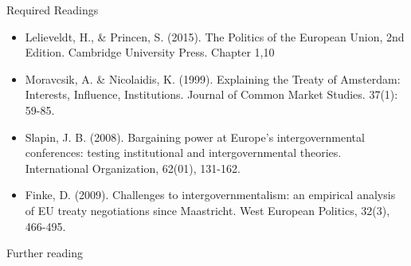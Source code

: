 \noindent Required Readings

\begin{itemize}
	\item Lelieveldt, H., \& Princen, S. (2015). The Politics of the European Union, 2nd Edition. Cambridge University Press. Chapter 1,10
	\item Moravcsik, A. \& Nicolaidis, K. (1999). Explaining the Treaty of
Amsterdam: Interests, Influence, Institutions. Journal of Common Market
Studies. 37(1): 59-85.
	\item Slapin, J. B. (2008). Bargaining power at Europe's intergovernmental conferences: testing institutional and intergovernmental theories. International Organization, 62(01), 131-162.
	\item Finke, D. (2009). Challenges to intergovernmentalism: an empirical analysis of EU treaty negotiations since Maastricht. West European Politics, 32(3), 466-495.
\end{itemize}

\noindent Further reading

